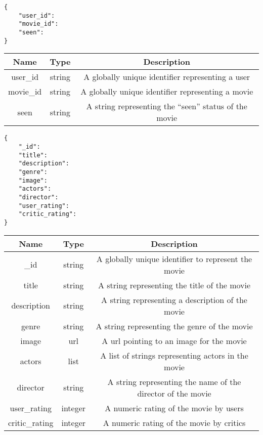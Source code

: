 \documentclass[11pt, letterpaper]{article}
\begin{document}
\bigskip


\bigskip

\begin{lstlisting}
{
    "user_id":
    "movie_id":
    "seen":
}
\end{lstlisting}

\bigskip

\setlength{\tabcolsep}{5pt}
\begin{tabular}{| c | c | c |}
    \toprule
    Name & Type & Description \\
    \midrule
    user\_id & string & A globally unique identifier representing a user\\
    \midrule
    movie\_id & string & A globally unique identifier representing a movie\\
    \midrule
    seen & string & A string representing the ``seen'' status of the movie\\
    \bottomrule
\end{tabular}

\bigskip
\bigskip
\bigskip


\bigskip

\begin{lstlisting}
{
    "_id":
    "title":
    "description":
    "genre":
    "image":
    "actors":
    "director":
    "user_rating":
    "critic_rating":
}
\end{lstlisting}

\bigskip

\setlength{\tabcolsep}{5pt}
\begin{tabular}{| c | c | c |}
    \toprule
    Name & Type & Description \\
    \midrule
    \_id & string & A globally unique identifier to represent the movie\\
    \midrule
    title & string & A string representing the title of the movie\\
    \midrule
    description & string & A string representing a description of the movie\\
    \midrule
    genre & string & A string representing the genre of the movie\\
    \midrule
    image & url & A url pointing to an image for the movie\\
    \midrule
    actors & list & A list of strings representing actors in the movie\\
    \midrule
    director & string & A string representing the name of the director of the movie\\
    \midrule
    user\_rating & integer & A numeric rating of the movie by users\\
    \midrule
    critic\_rating & integer & A numeric rating of the movie by critics\\
    \bottomrule
\end{tabular}
\end{document}
